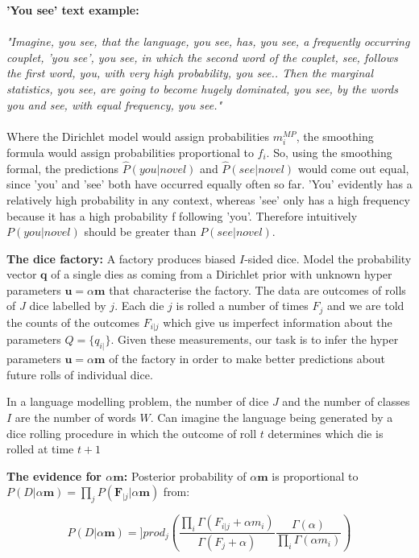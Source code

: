 \textbf{'You see' text example: } 
\\ \\
\noindent \textit{"Imagine, you see, that the language, you see, has, you see, a frequently occurring couplet, 'you see', you see, in which the second word of the couplet, see, follows the first word, you, with very high probability, you see.. Then the marginal statistics, you see, are going to become hugely dominated, you see, by the words you and see, with equal frequency, you see."}
\\ \\
\indent Where the Dirichlet model would assign probabilities $m_{i}^{MP}$, the smoothing formula would assign probabilities proportional to $f_{i}$. So, using the smoothing formal, the predictions $\hat{P}(you|novel)$ and $\hat{P}(see|novel)$ would come out equal, since 'you' and 'see' both have occurred equally often so far. 'You' evidently has a relatively high probability in any context, whereas 'see' only has a high frequency because it has a high probability f following 'you'. Therefore intuitively $P(you|novel)$ should be greater than $P(see|novel)$.

\textbf{The dice factory: } A factory produces biased $I$-sided dice. Model the probability vector $\boldsymbol{q}$ of a single dies as coming from a Dirichlet prior with unknown hyper parameters $\boldsymbol{u}=\alpha\boldsymbol{m}$ that characterise the factory. The data are outcomes of rolls of $J$ dice labelled by $j$. Each die $j$ is rolled a number of times $F_{j}$ and we are told the counts of the outcomes $F_{i|j}$ which give us imperfect information about the parameters $Q=\{q_{i|}\}$. Given these measurements, our task is to infer the hyper parameters $\boldsymbol{u}=\alpha\boldsymbol{m}$ of the factory in order to make better predictions about future rolls of individual dice.

In a language modelling problem, the number of dice $J$ and the number of classes $I$ are the number of words $W$. Can imagine the language being generated by a dice rolling procedure in which the outcome of roll $t$ determines which die is rolled at time $t+1$

\textbf{The evidence for $\alpha\boldsymbol{m}$: } Posterior probability of $\alpha\boldsymbol{m}$ is proportional to $P(D|\alpha\boldsymbol{m})=\prod_{j}P(\boldsymbol{F}_{|j}|\alpha\boldsymbol{m})$ from:

\begin{equation}
P(D|\alpha\boldsymbol{m})=]prod_{j}\left(\frac{\prod_{i}\Gamma(F_{i|j}+\alpha m_{i})}{\Gamma(F_{j}+\alpha)}\frac{\Gamma(\alpha)}{\prod_{i}\Gamma(\alpha m_{i})}\right)
\end{equation}

